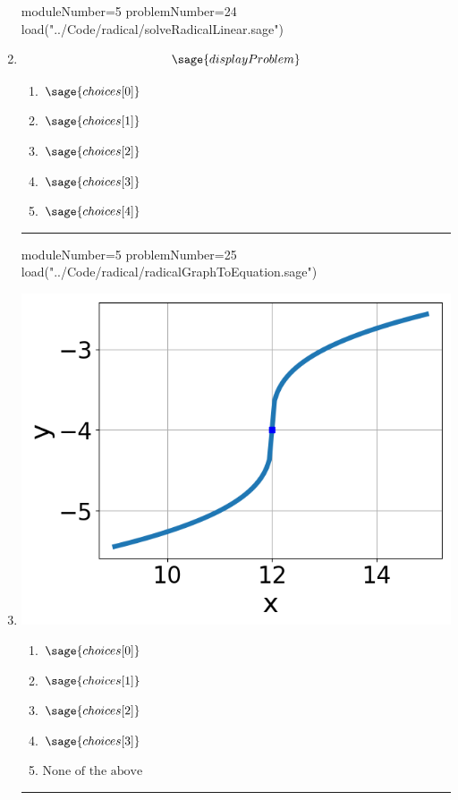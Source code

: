 \documentclass[14pt]{article}
\newcommand{\litem}[1]{\item#1\hspace*{-1cm}\rule{\textwidth}{0.4pt}}
\begin{document}
\begin{enumerate}
\begin{sagesilent}
moduleNumber=5
problemNumber=24
load("../Code/radical/solveRadicalLinear.sage")
\end{sagesilent}

\litem{

\[ \sage{displayProblem} \]

	\begin{enumerate}[label=\Alph*.]
		\item \( \sage{choices[0]} \)
		\item \( \sage{choices[1]} \)
		\item \( \sage{choices[2]} \)
		\item \( \sage{choices[3]} \)
		\item \( \sage{choices[4]} \)
	\end{enumerate}
}

\begin{sagesilent}
moduleNumber=5
problemNumber=25
load("../Code/radical/radicalGraphToEquation.sage")
\end{sagesilent}

\litem{
\begin{multicols}{2}
\begin{center}
\includegraphics[width=.3\textwidth]{../Figures/radicalGraphToEquationC.png}
\end{center}

\columnbreak

	\begin{enumerate}[label=\Alph*.]
		\item \( \sage{choices[0]} \)
		\item \( \sage{choices[1]} \)
		\item \( \sage{choices[2]} \)
		\item \( \sage{choices[3]} \)
    \item \( \text{None of the above} \)
	\end{enumerate}
\end{multicols}
}

\end{enumerate}
\end{document}
